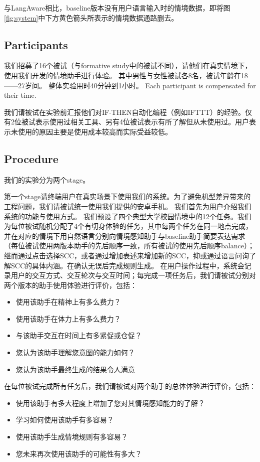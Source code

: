 与LangAware相比，baseline版本没有用户语言输入时的情境数据，即将图\ref{fig:system}中下方黄色箭头所表示的情境数据通路删去。


\subsection{Participants}

我们招募了16个被试（与formative study中的被试不同），请他们在真实情境下，使用我们开发的情境助手进行体验。
其中男性与女性被试各8名，被试年龄在18——27岁间。
整体实验用时40分钟到1小时。
Each participant is compensated for their time.

我们请被试在实验前汇报他们对IF-THEN自动化编程（例如IFTTT）的经验。仅有2位被试表示使用过相关工具、另有4位被试表示有所了解但从未使用过。用户表示未使用的原因主要是使用成本较高而实际受益较低。

\subsection{Procedure}

我们的实验分为两个stage。

第一个stage请终端用户在真实场景下使用我们的系统。为了避免机型差异带来的工程问题，我们请被试统一使用我们提供的安卓手机。
我们首先为用户介绍我们系统的功能与使用方式。
我们预设了四个典型大学校园情境中的12个任务。我们为每位被试随机分配了4个有切身体验的任务，其中每两个任务在同一地点完成，并在对应的情境下用自然语言分别向情境感知助手与baseline助手简要表达需求（每位被试使用两版本助手的先后顺序一致，所有被试的使用先后顺序balance）；继而通过点击选择SCC，或者通过增加表述来增加新的SCC，抑或通过语言问询了解SCC的具体内涵。在确认无误后完成规则生成。
在用户操作过程中，系统会记录用户的交互方式、交互轮次与交互时间；每完成一项任务后，我们请被试分别对两个版本的助手使用体验进行评价，包括：
\begin{itemize}
    \item 使用该助手在精神上有多么费力？
    \item 使用该助手在体力上有多么费力？
    \item 与该助手交互在时间上有多紧促或仓促？
    \item 您认为该助手理解您意图的能力如何？ 
    \item 您认为该助手最终生成的结果令人满意
\end{itemize}

在每位被试完成所有任务后，我们请被试对两个助手的总体体验进行评价，包括：
\begin{itemize}
    \item 使用该助手有多大程度上增加了您对其情境感知能力的了解？
    \item 学习如何使用该助手有多容易？
    \item 使用该助手生成情境规则有多容易？
    \item 您未来再次使用该助手的可能性有多大？
\end{itemize}

